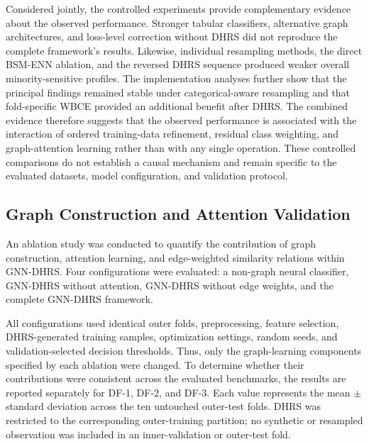 \documentclass[pdflatex,sn-mathphys-num]{sn-jnl}%
\theoremstyle{thmstyleone}%
\theoremstyle{thmstyletwo}%
\theoremstyle{thmstylethree}%
\begin{document}
 {
Considered jointly, the controlled experiments provide complementary evidence
about the observed performance. Stronger tabular classifiers, alternative
graph architectures, and loss-level correction without DHRS did not reproduce
the complete framework's results. Likewise, individual resampling methods,
the direct BSM-ENN ablation, and the reversed DHRS sequence produced weaker
overall minority-sensitive profiles. The implementation analyses further show
that the principal findings remained stable under categorical-aware
resampling and that fold-specific WBCE provided an additional benefit after
DHRS. The combined evidence therefore suggests that the observed performance
is associated with the interaction of ordered training-data refinement,
residual class weighting, and graph-attention learning rather than with any
single operation. These controlled comparisons do not establish a causal
mechanism and remain specific to the evaluated datasets, model configuration,
and validation protocol.
}



\subsection{Graph Construction and Attention Validation}
\label{subsec:graph_attention_validation}

An ablation study was conducted to quantify the contribution of graph
construction, attention learning, and edge-weighted similarity relations
within GNN-DHRS. Four configurations were evaluated: a non-graph neural
classifier, GNN-DHRS without attention, GNN-DHRS without edge weights, and
the complete GNN-DHRS framework.

 {
All configurations used identical outer folds, preprocessing, feature
selection, DHRS-generated training samples, optimization settings, random
seeds, and validation-selected decision thresholds. Thus, only the
graph-learning components specified by each ablation were changed. To
determine whether their contributions were consistent across the evaluated
benchmarks, the results are reported separately for DF-1, DF-2, and DF-3.
Each value represents the mean \(\pm\) standard deviation across the ten
untouched outer-test folds. DHRS was restricted to the corresponding
outer-training partition; no synthetic or resampled observation was included
in an inner-validation or outer-test fold.
}
\end{document}

